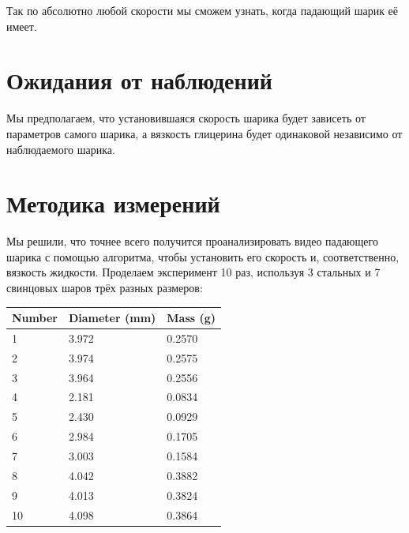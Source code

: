 \documentclass[a4paper, 12pt]{article}
\begin{document}
    Так по абсолютно любой скорости мы сможем узнать, когда падающий шарик её имеет.


    \section{Ожидания от наблюдений}

    Мы предполагаем, что установившаяся скорость шарика будет зависеть от параметров самого шарика,
    а вязкость глицерина будет одинаковой независимо от наблюдаемого шарика.


    \section{Методика измерений}

    Мы решили, что точнее всего получится проанализировать видео падающего шарика с помощью алгоритма,
    чтобы установить его скорость и, соответственно, вязкость жидкости.
    Проделаем эксперимент 10 раз, используя 3 стальных и 7 свинцовых шаров трёх разных размеров:

    \vspace{1.5em}
    \begin{tabular}{l l l}
        \bfseries Number & \bfseries Diameter (mm) & \bfseries Mass (g) \\ \hline
        1                & 3.972                   & 0.2570             \\ \hline
        2                & 3.974                   & 0.2575             \\ \hline
        3                & 3.964                   & 0.2556             \\ \hline
        4                & 2.181                   & 0.0834             \\ \hline
        5                & 2.430                   & 0.0929             \\ \hline
        6                & 2.984                   & 0.1705             \\ \hline
        7                & 3.003                   & 0.1584             \\ \hline
        8                & 4.042                   & 0.3882             \\ \hline
        9                & 4.013                   & 0.3824             \\ \hline
        10               & 4.098                   & 0.3864             \\ \hline
    \end{tabular}
    \vspace{1.5em}
\end{document}
